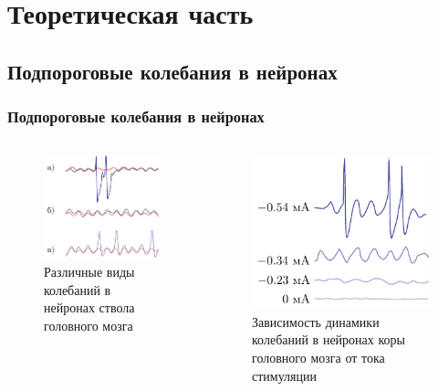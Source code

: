 \section{Теоретическая часть}
\subsection{Подпороговые колебания в нейронах}
\begin{frame}[c]
	\frametitle{Подпороговые колебания в нейронах}
	\begin{columns}
		\begin{column}{0.49\textwidth}
			\begin{figure}[h]
				\centering
				\includegraphics[]{img/img_1a}
				\caption[]{Различные виды колебаний в нейронах ствола головного мозга \cite{linas}}
			\end{figure}
		\end{column}
		\begin{column}{0.49\textwidth}
			\begin{figure}[h]
				\centering

				\includegraphics[]{img/img_1d}	
				\caption[]{Зависимость динамики колебаний в нейронах коры головного мозга от тока стимуляции\cite{linas}}
			\end{figure}
		\end{column}
	\end{columns}
\end{frame}
